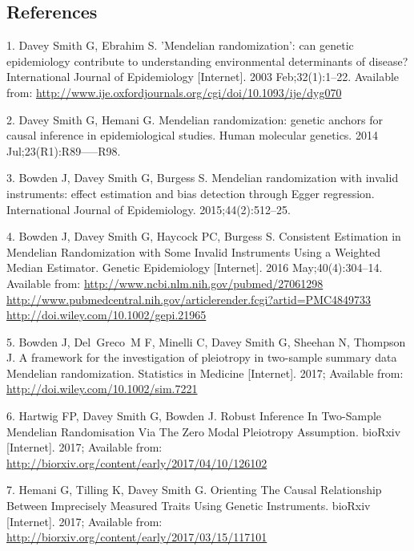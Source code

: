 \documentclass[]{article}
\begin{document}
\subsection*{References}\label{references}

\hypertarget{refs}{}
\hypertarget{ref-DaveySmith2003}{}
1. Davey Smith G, Ebrahim S. 'Mendelian randomization': can genetic
epidemiology contribute to understanding environmental determinants of
disease? International Journal of Epidemiology {[}Internet{]}. 2003
Feb;32(1):1--22. Available from:
\url{http://www.ije.oxfordjournals.org/cgi/doi/10.1093/ije/dyg070}

\hypertarget{ref-DaveySmithHemani2014}{}
2. Davey Smith G, Hemani G. Mendelian randomization: genetic anchors for
causal inference in epidemiological studies. Human molecular genetics.
2014 Jul;23(R1):R89-----R98.

\hypertarget{ref-Bowden2015}{}
3. Bowden J, Davey Smith G, Burgess S. Mendelian randomization with
invalid instruments: effect estimation and bias detection through Egger
regression. International Journal of Epidemiology. 2015;44(2):512--25.

\hypertarget{ref-Bowden2016b}{}
4. Bowden J, Davey Smith G, Haycock PC, Burgess S. Consistent Estimation
in Mendelian Randomization with Some Invalid Instruments Using a
Weighted Median Estimator. Genetic Epidemiology {[}Internet{]}. 2016
May;40(4):304--14. Available from:
\href{http://www.ncbi.nlm.nih.gov/pubmed/27061298\%20http://www.pubmedcentral.nih.gov/articlerender.fcgi?artid=PMC4849733\%20http://doi.wiley.com/10.1002/gepi.21965}{http://www.ncbi.nlm.nih.gov/pubmed/27061298 http://www.pubmedcentral.nih.gov/articlerender.fcgi?artid=PMC4849733 http://doi.wiley.com/10.1002/gepi.21965}

\hypertarget{ref-Bowden2017}{}
5. Bowden J, Del~Greco~M F, Minelli C, Davey Smith G, Sheehan N,
Thompson J. A framework for the investigation of pleiotropy in
two-sample summary data Mendelian randomization. Statistics in Medicine
{[}Internet{]}. 2017; Available from:
\url{http://doi.wiley.com/10.1002/sim.7221}

\hypertarget{ref-Hartwig2017}{}
6. Hartwig FP, Davey Smith G, Bowden J. Robust Inference In Two-Sample
Mendelian Randomisation Via The Zero Modal Pleiotropy Assumption.
bioRxiv {[}Internet{]}. 2017; Available from:
\url{http://biorxiv.org/content/early/2017/04/10/126102}

\hypertarget{ref-Hemani2017}{}
7. Hemani G, Tilling K, Davey Smith G. Orienting The Causal Relationship
Between Imprecisely Measured Traits Using Genetic Instruments. bioRxiv
{[}Internet{]}. 2017; Available from:
\url{http://biorxiv.org/content/early/2017/03/15/117101}
\end{document}
